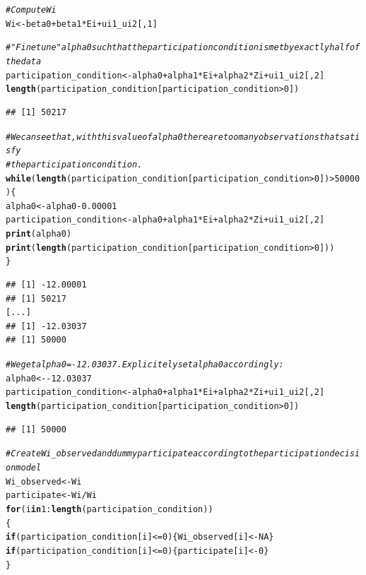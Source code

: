 \documentclass{article}\usepackage[]{graphicx}\usepackage[]{xcolor}
\makeatletter
\newcommand{\hlnum}[1]{\textcolor[rgb]{0.686,0.059,0.569}{#1}}%
\newcommand{\hlcom}[1]{\textcolor[rgb]{0.678,0.584,0.686}{\textit{#1}}}%
\newcommand{\hlopt}[1]{\textcolor[rgb]{0,0,0}{#1}}%
\newcommand{\hldef}[1]{\textcolor[rgb]{0.345,0.345,0.345}{#1}}%
\newcommand{\hlkwa}[1]{\textcolor[rgb]{0.161,0.373,0.58}{\textbf{#1}}}%
\newcommand{\hlkwb}[1]{\textcolor[rgb]{0.69,0.353,0.396}{#1}}%
\newcommand{\hlkwd}[1]{\textcolor[rgb]{0.737,0.353,0.396}{\textbf{#1}}}%
\newenvironment{kframe}{%
 \def\at@end@of@kframe{}%
 \ifinner\ifhmode%
  \def\at@end@of@kframe{\end{minipage}}%
  \begin{minipage}{\columnwidth}%
 \fi\fi%
 \def\FrameCommand##1{\hskip\@totalleftmargin \hskip-\fboxsep
 \colorbox{shadecolor}{##1}\hskip-\fboxsep
     \hskip-\linewidth \hskip-\@totalleftmargin \hskip\columnwidth}%
 \MakeFramed {\advance\hsize-\width
   \@totalleftmargin\z@ \linewidth\hsize
   \@setminipage}}%
 {\par\unskip\endMakeFramed%
 \at@end@of@kframe}
\newenvironment{knitrout}{}{} %
\makeatother
\begin{document}
\begin{knitrout}
\begin{kframe}
\begin{alltt}
\hlcom{# Compute Wi}
\hldef{Wi} \hlkwb{<-} \hldef{beta0}\hlopt{+}\hldef{beta1}\hlopt{*}\hldef{Ei}\hlopt{+}\hldef{ui1_ui2[,}\hlnum{1}\hldef{]}

\hlcom{# "Fine tune" alpha0 such that the participation condition is met by exactly half of the data}
\hldef{participation_condition} \hlkwb{<-} \hldef{alpha0}\hlopt{+}\hldef{alpha1}\hlopt{*}\hldef{Ei}\hlopt{+}\hldef{alpha2}\hlopt{*}\hldef{Zi}\hlopt{+}\hldef{ui1_ui2[,}\hlnum{2}\hldef{]}
\hlkwd{length}\hldef{(participation_condition[participation_condition}\hlopt{>}\hlnum{0}\hldef{])}
\end{alltt}
\begin{verbatim}
## [1] 50217
\end{verbatim}
\begin{alltt}
\hlcom{# We can see that, with this value of alpha0 there are too many observations that satisfy}
\hlcom{#the participation condition.}
\hlkwa{while} \hldef{(}\hlkwd{length}\hldef{(participation_condition[participation_condition}\hlopt{>}\hlnum{0}\hldef{])}\hlopt{>}\hlnum{50000}\hldef{) \{}
   \hldef{alpha0} \hlkwb{<-} \hldef{alpha0}\hlopt{-}\hlnum{0.00001}
   \hldef{participation_condition} \hlkwb{<-} \hldef{alpha0}\hlopt{+}\hldef{alpha1}\hlopt{*}\hldef{Ei}\hlopt{+}\hldef{alpha2}\hlopt{*}\hldef{Zi}\hlopt{+}\hldef{ui1_ui2[,}\hlnum{2}\hldef{]}
   \hlkwd{print}\hldef{(alpha0)}
   \hlkwd{print}\hldef{(}\hlkwd{length}\hldef{(participation_condition[participation_condition}\hlopt{>}\hlnum{0}\hldef{]))}
\hldef{\}}
\end{alltt}
\begin{verbatim}
## [1] -12.00001
## [1] 50217
[...]
## [1] -12.03037
## [1] 50000
\end{verbatim}
\begin{alltt}
\hlcom{# We get alpha0=-12.03037. Explicitely set alpha0 accordingly:}
\hldef{alpha0} \hlkwb{<-} \hlopt{-}\hlnum{12.03037}
\hldef{participation_condition} \hlkwb{<-} \hldef{alpha0}\hlopt{+}\hldef{alpha1}\hlopt{*}\hldef{Ei}\hlopt{+}\hldef{alpha2}\hlopt{*}\hldef{Zi}\hlopt{+}\hldef{ui1_ui2[,}\hlnum{2}\hldef{]}
\hlkwd{length}\hldef{(participation_condition[participation_condition}\hlopt{>}\hlnum{0}\hldef{])}
\end{alltt}
\begin{verbatim}
## [1] 50000
\end{verbatim}
\begin{alltt}
\hlcom{# Create Wi_observed and dummy participate according to the participation decision model}
\hldef{Wi_observed} \hlkwb{<-} \hldef{Wi}
\hldef{participate} \hlkwb{<-} \hldef{Wi}\hlopt{/}\hldef{Wi}
\hlkwa{for} \hldef{(i} \hlkwa{in} \hlnum{1}\hlopt{:}\hlkwd{length}\hldef{(participation_condition))}
\hldef{\{}
  \hlkwa{if} \hldef{(participation_condition[i]}\hlopt{<=}\hlnum{0}\hldef{) \{Wi_observed[i]} \hlkwb{<-}\hlnum{NA}\hldef{\}}
  \hlkwa{if} \hldef{(participation_condition[i]}\hlopt{<=}\hlnum{0}\hldef{) \{participate[i]} \hlkwb{<-}\hlnum{0}\hldef{\}}
\hldef{\}}


\end{alltt}
\end{kframe}
\end{knitrout}
\end{document}
